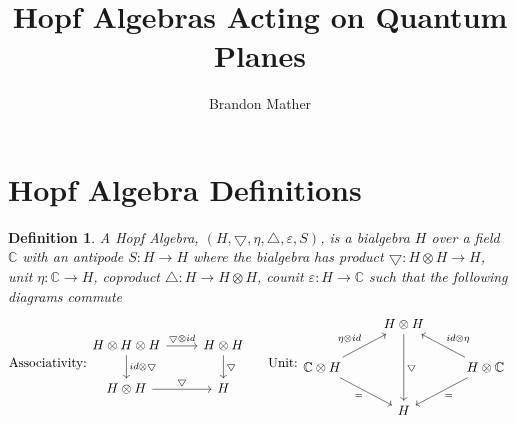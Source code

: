 \documentclass[12pt,a4paper]{article}
\title{Hopf Algebras Acting on Quantum Planes}
\date{}
\author{Brandon Mather}
\newtheorem{definition}[theorem]{Definition}
\newcommand\1{_{(1)}}
\newcommand\2{_{(2)}}
\begin{document}

\maketitle

\section{Hopf Algebra Definitions}
\begin{definition}
A Hopf Algebra, $\left(H,\bigtriangledown,\eta,\triangle,\varepsilon,S\right)$, is a bialgebra $H$ over a field $\mathbb{C}$ with an antipode $S:H\to H$ where the bialgebra has product $\bigtriangledown:H\otimes H\to H$, unit $\eta:\mathbb{C}\to H$, coproduct $\triangle:H\to H\otimes H$, counit $\varepsilon:H\to\mathbb{C}$ such that the following diagrams commute
\[
\text{Associativity:}
\begin{tikzcd}
H\otimes H\otimes H \arrow[d, "id\otimes \bigtriangledown"] \arrow[r, "\bigtriangledown\otimes id"] & H\otimes H \arrow[d, "\bigtriangledown"] \\
H\otimes H \arrow[r, "\bigtriangledown"]                                                         & H                                    
\end{tikzcd}
\text{   \;\;\;\;Unit:}
\begin{tikzcd}
                                                           & H\otimes H \arrow[dd, "\bigtriangledown"] &                                                           \\
\mathbb{C}\otimes H \arrow[ru, "\eta\otimes id"] \arrow[rd, "="'] &                                        & H\otimes \mathbb{C} \arrow[lu, "id\otimes\eta"'] \arrow[ld, "="] \\
                                                           & H                                      &                                                          

\end{tikzcd}\]
\end{definition}
\end{document}
